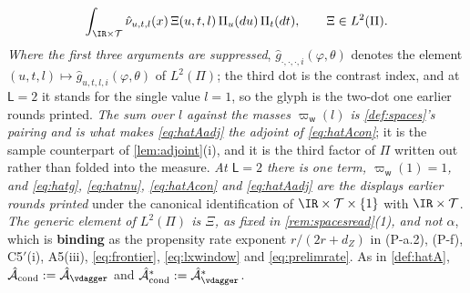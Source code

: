\begin{definition}
\begin{equation}
\int_{\IR\times\mathcal T}\hat\nu_{u,t,l}(x)\,
\Xi(u,t,l)\,\Pi_u(du)\,\Pi_t(dt),
\qquad \Xi\in L^{2}(\Pi) .
\end{equation}
\emph{Where the first three arguments are suppressed}, $\hat g_{\cdot,\cdot,\cdot,i}(\varphi,\theta)$
denotes the element $(u,t,l)\mapsto\hat g_{u,t,l,i}(\varphi,\theta)$ of $L^{2}(\Pi)$; the third dot
is the contrast index, and at $\mathsf L=2$ it stands for the single value $l=1$, so the glyph is the
two-dot one earlier rounds printed.
\emph{The sum over $l$ against the masses $\varpi_{\mathsf w}(l)$ is \cref{def:spaces}'s pairing and is
what makes \eqref{eq:hatAadj} the adjoint of \eqref{eq:hatAcon}}; it is the sample counterpart of
\cref{lem:adjoint}\textup{(i)}, and it is the third factor of $\Pi$ written out rather than folded into
the measure. \emph{At $\mathsf L=2$ there is one term, $\varpi_{\mathsf w}(1)=1$, and \eqref{eq:hatg},
\eqref{eq:hatnu}, \eqref{eq:hatAcon} and \eqref{eq:hatAadj} are the displays earlier rounds printed}
under the canonical identification of $\IR\times\mathcal T\times\{1\}$ with $\IR\times\mathcal T$.
\emph{The generic element of $L^{2}(\Pi)$ is $\Xi$, as fixed in \cref{rem:spacesread}\textup{(1)}, and not $\alpha$},
which is \textbf{binding} as the propensity rate exponent $r/(2r+d_Z)$ in (P-a.2), (P-f), C5$'$(i),
A5(iii), \eqref{eq:frontier}, \eqref{eq:lxwindow} and \eqref{eq:prelimrate}.
As in \cref{def:hatA}, $\hat{\mathcal A}_{\mathrm{cond}}:=\hat{\mathcal A}_{\vdagger}$ and
$\hat{\mathcal A}^\ast_{\mathrm{cond}}:=\hat{\mathcal A}^\ast_{\vdagger}$.


\end{definition}
